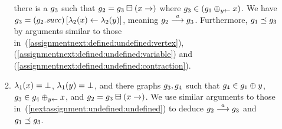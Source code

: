 \begin{enumerate}
\begin{enumerate}
there is a $g_3$ such that
$g_2=g_3\boxminus({x}\rightarrow)$ where
$g_3\in(g_1\oplus_{{y}\leftarrow}{x})$.
%
We have $g_3=\left(g_2.{\it succ}\right)
\left[\lambda_2(x)\leftarrow\lambda_2(y)\right]$, meaning 
$g_2\stackrel{a}{\longrightarrow}g_3$.
%
Furthermore, $g_1\preceq g_3$ by arguments
similar to those 
in~(\ref{assignmentnext:defined:undefined:vertex}),
(\ref{assignmentnext:defined:undefined:variable})
and (\ref{assignmentnext:defined:undefined:contraction}).
\item
$\lambda_1(x)=\bot$,
$\lambda_1(y)=\bot$, and
there  graphs $g_3,g_4$ such that
$g_4\in g_1\oplus{\ensuremath{y}}$,
$g_3\in g_4\oplus_{{y}\leftarrow}{x}$, and
$g_2=g_3\boxminus({x}\rightarrow)$.
%
We use similar arguments to 
those in~(\ref{nextassignment:undefined:undefined}) 
to deduce $g_2\stackrel{a}{\longrightarrow}g_3$
and $g_1\preceq g_3$.
\end{enumerate}
\end{enumerate}


